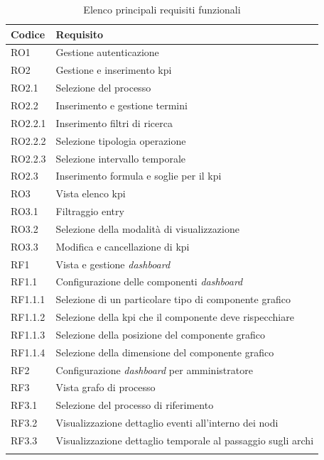 \begin{longtable}[!h]{|p{}|p{}|}
    \hline
        \textbf{Codice} & \textbf{Requisito} \\ \hline
         RO1 & Gestione autenticazione \\ \hline
         RO2 & Gestione e inserimento \acrshort{kpi} \\ \hline
         RO2.1 & Selezione del processo\\ \hline
         RO2.2 & Inserimento e gestione termini\\ \hline
         RO2.2.1 & Inserimento filtri di ricerca\\ \hline
         RO2.2.2 & Selezione tipologia operazione\\ \hline
         RO2.2.3 & Selezione intervallo temporale\\ \hline
         RO2.3 & Inserimento formula e soglie per il \acrshort{kpi}\\ \hline
         RO3 & Vista elenco \acrshort{kpi}\\ \hline
         RO3.1 & Filtraggio entry\\ \hline
         RO3.2 & Selezione della modalità di visualizzazione\\ \hline
         RO3.3 & Modifica e cancellazione di \acrshort{kpi}\\ \hline
         RF1 & Vista e gestione \textit{dashboard}\\ \hline
         RF1.1 & Configurazione delle componenti \textit{dashboard}\\ \hline
         RF1.1.1 & Selezione di un particolare tipo di componente grafico\\ \hline
         RF1.1.2 & Selezione della \acrshort{kpi} che il componente deve rispecchiare\\ \hline
         RF1.1.3 & Selezione della posizione del componente grafico\\ \hline
         RF1.1.4 & Selezione della dimensione del componente grafico\\ \hline
         RF2 & Configurazione \textit{dashboard} per amministratore\\ \hline
         RF3 & Vista grafo di processo\\ \hline
         RF3.1 & Selezione del processo di riferimento\\ \hline
         RF3.2 & Visualizzazione dettaglio eventi all'interno dei nodi\\ \hline
         RF3.3 & Visualizzazione dettaglio temporale al passaggio sugli archi\\ \hline
    \caption{Elenco principali requisiti funzionali}
    \label{tab:requirements}
\end{longtable}
